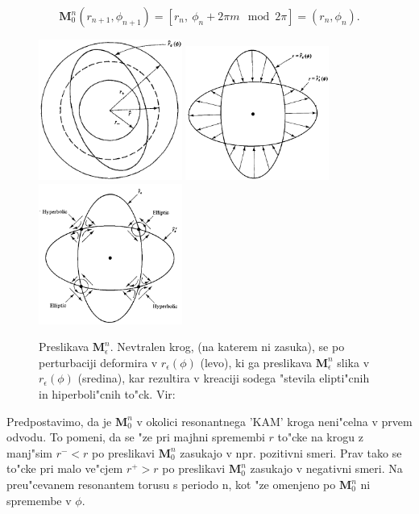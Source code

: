 \documentclass[]{article}
\begin{document}
\begin{equation}
\boldsymbol{M}_0^n(r_{n+1},\phi_{n+1})=[r_{n},\ \phi_{n}+2\pi m \mod 2\pi]=(r_{n},\phi_{n}).
\end{equation}
\begin{figure}[!htb]
	\begin{center}
		\includegraphics[width = 4.7cm]{41}
		\includegraphics[width = 4.7cm]{42}
		\includegraphics[width = 4.7cm]{43}
		\caption{Preslikava $\boldsymbol{M}_\epsilon^n$. Nevtralen krog, (na katerem ni zasuka), se po perturbaciji deformira v $r_\epsilon(\phi)$ (levo), ki ga preslikava $\boldsymbol{M}_\epsilon^n$ slika v $r_\epsilon(\phi)$ (sredina), kar rezultira v kreaciji sodega "stevila elipti"cnih in hiperboli"cnih to"ck. Vir: \cite{1}}
		\label{slika 4}
	\end{center}
\end{figure}
Predpostavimo, da je $\boldsymbol{M}_0^n$ v okolici resonantnega 'KAM' kroga neni"celna v prvem odvodu. To pomeni, da se "ze pri majhni spremembi $r$ to"cke na krogu z manj"sim $r^-<r$ po preslikavi $\boldsymbol{M}_0^n$ zasukajo v npr. pozitivni smeri. Prav tako se to"cke pri malo ve"cjem $r^+>r$ po preslikavi $\boldsymbol{M}_0^n$ zasukajo v negativni smeri. Na preu"cevanem resonantem torusu s periodo n, kot "ze omenjeno po $\boldsymbol{M}_0^n$ ni spremembe v $\phi$.\newline
\end{document}
